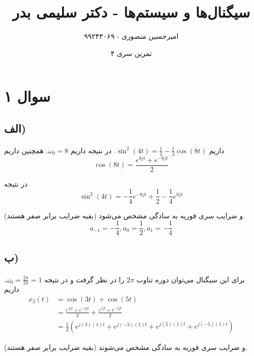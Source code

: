\documentclass{article}
\title{سیگنال‌ها و سیستم‌ها - دکتر سلیمی بدر}
\author{امیرحسین منصوری - ۹۹۲۴۳۰۶۹}
\date{تمرین سری ۴}
\begin{document}
	\maketitle

	\section*{سوال ۱}
	\subsection*{الف)}
	\paragraph*{}
	داریم
	$\sin^2(4t) = \frac{1}{2} - \frac{1}{2}\cos(8t)$.
	در نتیجه داریم
	$\omega_0 = 8$.
	همچنین داریم
	\begin{equation*}
		\cos(8t) = \frac{e^{8jt} + e^{-8jt}}{2}
	\end{equation*}

	در نتیجه
	\begin{equation*}
		\sin^2(4t) = -\frac{1}{4} e^{-8jt} + \frac{1}{2} - \frac{1}{4} e^{8jt}
	\end{equation*}

	و ضرایب سری فوریه به سادگی مشخص می‌شود (بقیه ضرایب برابر صفر هستند).
	\begin{equation*}
		a_{-1} = -\frac{1}{4}, a_0 = \frac{1}{2}, a_1 = -\frac{1}{4}
	\end{equation*}

	\subsection*{ب)}
	\paragraph*{}

	برای این سیگنال می‌توان دوره تناوب
	$2\pi$
	را در نظر گرفت و در نتیجه
	$\omega_0 = \frac{2\pi}{2\pi} = 1$.
	داریم
	\begin{align*}
		x_2(t) &= \cos(3t) + \cos(5t) \\
		&= \frac{e^{3jt} + e^{-3jt}}{2} + \frac{e^{5jt} + e^{-5jt}}{2} \\
		&= \frac{1}{2} \left(e^{j(3)(1)t} + e^{j(-3)(1)t} + e^{j(5)(1)t} + e^{j(-5)(1)t}\right)
	\end{align*}

	و ضرایب سری فوریه به سادگی مشخص می‌شوند (بقیه ضرایب برابر صفر هستند).
\end{document}
